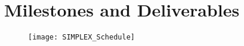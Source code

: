\documentclass[11pt]{article}
\begin{document}
% 
% 

\appendix
\section{Milestones and Deliverables}


\begin{figure}[b!]
\centering
\texttt{[image: SIMPLEX\_Schedule]}%
\end{figure}
\end{document}
